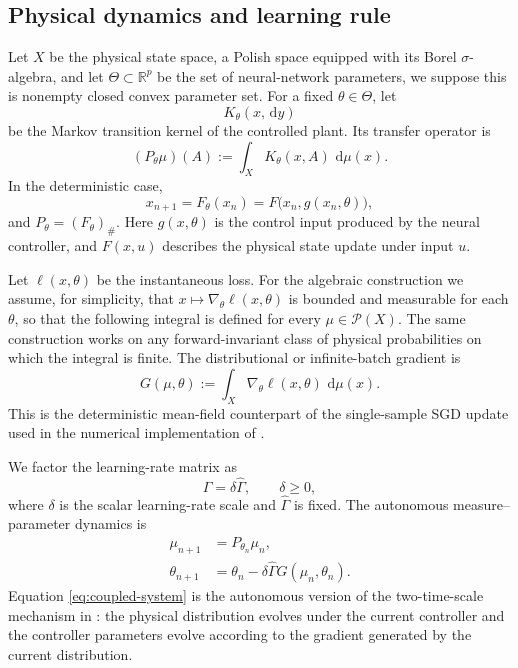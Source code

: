 \documentclass[11pt]{article}
\theoremstyle{definition}
\theoremstyle{remark}
\newcommand{\Prob}{\mathcal{P}}
\newcommand{\dd}{\,\mathrm{d}}
\newcommand{\ThetaSet}{\Theta}
\newcommand{\Gammahat}{\widehat{\Gamma}}
\begin{document}
\subsection{Physical dynamics and learning rule}



Let $X$ be the physical state space, a Polish space equipped with its Borel
$\sigma$-algebra, and let $\ThetaSet\subset\mathbb R^p$
be the set of neural-network parameters, we suppose this is nonempty closed convex parameter set.
  For a fixed
\(\theta\in\ThetaSet\), let
\begin{equation}
  K_\theta(x,\dd y)
  \label{eq:kernel}
\end{equation}
be the Markov transition kernel of the controlled plant.  Its transfer operator
is
\begin{equation}
  (P_\theta\mu)(A)
  :=\int_X K_\theta(x,A)\,\dd\mu(x).
  \label{eq:plant-transfer}
\end{equation}
In the deterministic case,
\[
  x_{n+1}=F_{\theta}(x_n)
  =F\bigl(x_n,g(x_n,\theta)\bigr),
\]
and \(P_\theta=(F_\theta)_\#\).
Here $g(x,\theta)$ is the control input produced by the
neural controller, and $F(x,u)$ describes the physical
state update under input $u$.

Let \(\ell(x,\theta)\) be the instantaneous loss.  For the algebraic
construction we assume, for simplicity, that
\(x\mapsto\nabla_\theta\ell(x,\theta)\) is bounded and measurable for each
\(\theta\), so that the following integral is defined for every
\(\mu\in\Prob(X)\).  The same construction works on any forward-invariant
class of physical probabilities on which the integral is finite.  The
distributional or infinite-batch gradient is
\begin{equation}
  G(\mu,\theta)
  :=\int_X \nabla_\theta\ell(x,\theta)\,\dd\mu(x).
  \label{eq:mean-gradient}
\end{equation}
This is the deterministic mean-field counterpart of the single-sample SGD
update used in the numerical implementation of \cite{LippiActionError}.

We factor the learning-rate matrix as
\begin{equation}
  \Gamma=\delta\Gammahat,
  \qquad \delta\geq0,
  \label{eq:learning-rate}
\end{equation}
where \(\delta\) is the scalar learning-rate scale and \(\Gammahat\) is fixed.
The autonomous measure--parameter dynamics is
\begin{equation}
  \boxed{
  \begin{aligned}
    \mu_{n+1}&=P_{\theta_n}\mu_n,\\
    \theta_{n+1}&=\theta_n-\delta\Gammahat
                    G(\mu_n,\theta_n).
  \end{aligned}}
  \label{eq:coupled-system}
\end{equation}
Equation \eqref{eq:coupled-system} is the autonomous version of the two-time-scale mechanism in \cite{LippiActionError}: the physical distribution evolves
under the current controller and the controller parameters evolve according to
the gradient generated by the current distribution.
\end{document}
